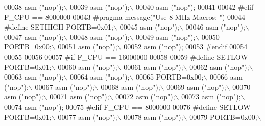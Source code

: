 \begin{DoxyCode}
00038 \textcolor{preprocessor}{               asm ("nop");\(\backslash\)}
00039 \textcolor{preprocessor}{               asm ("nop");\(\backslash\)}
00040 \textcolor{preprocessor}{               asm ("nop");}
00041                
00042 \textcolor{preprocessor}{#elif F\_CPU == 8000000}
00043 \textcolor{preprocessor}{#pragma message("Use 8 MHz Macros: ")}
00044 \textcolor{preprocessor}{#define SETHIGH PORTB=0x01;\(\backslash\)}
00045 \textcolor{preprocessor}{               asm ("nop");\(\backslash\)}
00046 \textcolor{preprocessor}{               asm ("nop");\(\backslash\)}
00047 \textcolor{preprocessor}{               asm ("nop");\(\backslash\)}
00048 \textcolor{preprocessor}{               asm ("nop");\(\backslash\)}
00049 \textcolor{preprocessor}{               asm ("nop");\(\backslash\)}
00050 \textcolor{preprocessor}{               PORTB=0x00;\(\backslash\)}
00051 \textcolor{preprocessor}{               asm ("nop");\(\backslash\)}
00052 \textcolor{preprocessor}{               asm ("nop");}
00053 \textcolor{preprocessor}{#endif}
00054 
00055 
00056 
00057 \textcolor{preprocessor}{#if F\_CPU == 16000000}
00058 
00059 \textcolor{preprocessor}{#define SETLOW PORTB=0x01;\(\backslash\)}
00060 \textcolor{preprocessor}{              asm ("nop");\(\backslash\)}
00061 \textcolor{preprocessor}{              asm ("nop");\(\backslash\)}
00062 \textcolor{preprocessor}{              asm ("nop");\(\backslash\)}
00063 \textcolor{preprocessor}{              asm ("nop");\(\backslash\)}
00064 \textcolor{preprocessor}{              asm ("nop");\(\backslash\)}
00065 \textcolor{preprocessor}{              PORTB=0x00;\(\backslash\)}
00066 \textcolor{preprocessor}{              asm ("nop");\(\backslash\)}
00067 \textcolor{preprocessor}{              asm ("nop");\(\backslash\)}
00068 \textcolor{preprocessor}{              asm ("nop");\(\backslash\)}
00069 \textcolor{preprocessor}{              asm ("nop");\(\backslash\)}
00070 \textcolor{preprocessor}{              asm ("nop");\(\backslash\)}
00071 \textcolor{preprocessor}{              asm ("nop");\(\backslash\)}
00072 \textcolor{preprocessor}{              asm ("nop");\(\backslash\)}
00073 \textcolor{preprocessor}{              asm ("nop");\(\backslash\)}
00074 \textcolor{preprocessor}{              asm ("nop");}
00075 \textcolor{preprocessor}{#elif F\_CPU == 8000000}
00076 \textcolor{preprocessor}{#define SETLOW PORTB=0x01;\(\backslash\)}
00077 \textcolor{preprocessor}{               asm ("nop");\(\backslash\)}
00078 \textcolor{preprocessor}{               asm ("nop");\(\backslash\)}
00079 \textcolor{preprocessor}{               PORTB=0x00;\(\backslash\)}

\end{DoxyCode}

